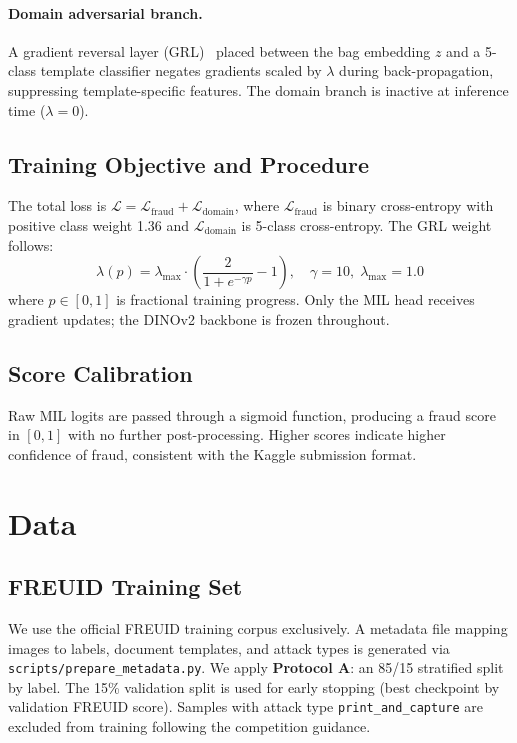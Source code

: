 \documentclass[11pt,a4paper]{article}
\begin{document}
\paragraph{Domain adversarial branch.}
A gradient reversal layer (GRL)~\cite{freuid2026} placed between the bag embedding $z$ and a 5-class template classifier negates gradients scaled by $\lambda$ during back-propagation, suppressing template-specific features. The domain branch is inactive at inference time ($\lambda = 0$).

\subsection{Training Objective and Procedure}

The total loss is $\mathcal{L} = \mathcal{L}_\text{fraud} + \mathcal{L}_\text{domain}$, where $\mathcal{L}_\text{fraud}$ is binary cross-entropy with positive class weight 1.36 and $\mathcal{L}_\text{domain}$ is 5-class cross-entropy. The GRL weight follows:
\[
  \lambda(p) = \lambda_{\max} \cdot \left(\frac{2}{1 + e^{-\gamma p}} - 1\right), \quad \gamma = 10,\; \lambda_{\max} = 1.0
\]
where $p \in [0,1]$ is fractional training progress. Only the MIL head receives gradient updates; the DINOv2 backbone is frozen throughout.

\subsection{Score Calibration}

Raw MIL logits are passed through a sigmoid function, producing a fraud score in $[0,1]$ with no further post-processing. Higher scores indicate higher confidence of fraud, consistent with the Kaggle submission format.

\section{Data}
\label{sec:data}

\subsection{FREUID Training Set}

We use the official FREUID training corpus exclusively. A metadata file mapping images to labels, document templates, and attack types is generated via \texttt{scripts/prepare\_metadata.py}. We apply \textbf{Protocol A}: an 85/15 stratified split by label. The 15\% validation split is used for early stopping (best checkpoint by validation FREUID score). Samples with attack type \texttt{print\_and\_capture} are excluded from training following the competition guidance.
\end{document}
